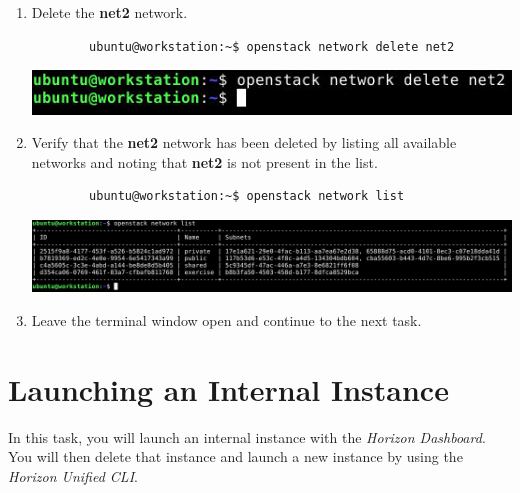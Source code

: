 \documentclass[letterpaper, 12pt]{article}
\begin{document}
\begin{enumerate}
    \item Delete the \textbf{net2} network.
    \begin{lstlisting}
        ubuntu@workstation:~$ openstack network delete net2
    \end{lstlisting}

    \begin{center}
        \includegraphics[width=\linewidth]{images/part3/step14.png}
    \end{center}

    \item Verify that the \textbf{net2} network has been deleted by listing all available networks and noting that
    \textbf{net2} is not present in the list.
    \begin{lstlisting}
        ubuntu@workstation:~$ openstack network list
    \end{lstlisting}

    \begin{center}
        \includegraphics[width=\linewidth]{images/part3/step15.png}
    \end{center}

    \item Leave the terminal window open and continue to the next task.

\end{enumerate}

\section{Launching an Internal Instance}
\label{sec:launching_an_internal_instance}
In this task, you will launch an internal instance with the \textit{Horizon Dashboard}. You will then delete that
instance and launch a new instance by using the \textit{Horizon Unified CLI}.
\end{document}

